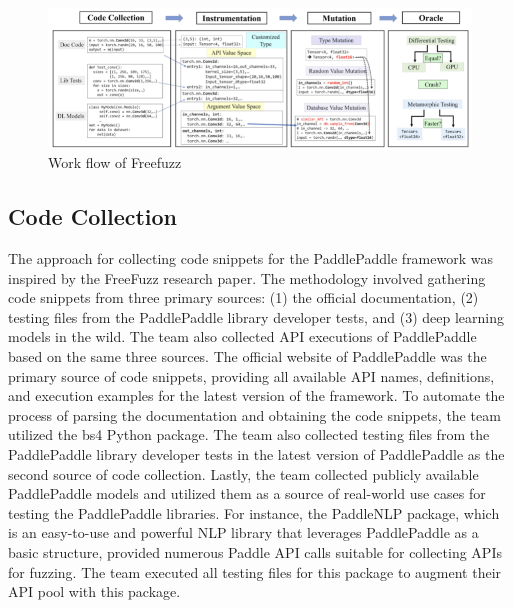 \documentclass[sigconf]{acmart}
\begin{document}
  \begin{figure}[h]
    \centering
    \includegraphics[width=\linewidth]{1.png}
    \caption{Work flow of Freefuzz}
  \end{figure}
  \subsection{Code Collection}
  The approach for collecting code snippets for the PaddlePaddle framework was inspired by the FreeFuzz research paper. 
  The methodology involved gathering code snippets from three primary sources: (1) the official documentation, (2) testing files from the PaddlePaddle library developer tests, 
  and (3) deep learning models in the wild. The team also collected API executions of PaddlePaddle based on the same three sources. 
  The official website of PaddlePaddle was the primary source of code snippets, providing all available API names, definitions, and execution examples for the latest version of the framework. 
  To automate the process of parsing the documentation and obtaining the code snippets, the team utilized the bs4 Python package. 
  The team also collected testing files from the PaddlePaddle library developer tests in the latest version of PaddlePaddle as the second source of code collection. 
  Lastly, the team collected publicly available PaddlePaddle models and utilized them as a source of real-world use cases for testing the PaddlePaddle libraries. 
  For instance, the PaddleNLP package, which is an easy-to-use and powerful NLP library that leverages PaddlePaddle as a basic structure, provided numerous Paddle API calls suitable for collecting APIs for fuzzing. 
  The team executed all testing files for this package to augment their API pool with this package.
    
\end{document}
